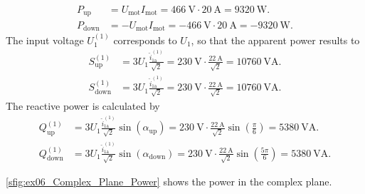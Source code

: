 \begin{solutionblock}
    \begin{equation}
        \begin{split}
            P_\mathrm{up}&=U_\mathrm{mot} I_\mathrm{mot}=\SI{466}{\volt} \cdot \SI{20}{\ampere}= \SI{9320}{\watt}. \\
            P_\mathrm{down}&=-U_\mathrm{mot} I_\mathrm{mot}=\SI{-466}{\volt} \cdot \SI{20}{\ampere}= \SI{-9320}{\watt}.
        \end{split}
    \end{equation}
    The input voltage $U_\mathrm{1}^\mathrm{(1)}$ corresponds to $U_\mathrm{1}$, so that the apparent power results to
    \begin{equation}
        \begin{split}
            S_\mathrm{up}^\mathrm{(1)}&=3 U_\mathrm{1} \frac{\hat{i}_\mathrm{1a}^\mathrm{(1)}}{\sqrt{2}}=\SI{230}{\volt} \cdot \frac{\SI{22}{\ampere}}{\sqrt{2}}= \SI{10760}{\volt\ampere}. \\
            S_\mathrm{down}^\mathrm{(1)}&=3 U_\mathrm{1} \frac{\hat{i}_\mathrm{1a}^\mathrm{(1)}}{\sqrt{2}}=\SI{230}{\volt} \cdot \frac{\SI{22}{\ampere}}{\sqrt{2}}= \SI{10760}{\volt\ampere}.
        \end{split}
    \end{equation}
    The reactive power is calculated by
    \begin{equation}
        \begin{split}
            Q_\mathrm{up}^\mathrm{(1)}&=3 U_\mathrm{1} \frac{\hat{i}_\mathrm{1a}^\mathrm{(1)}}{\sqrt{2}} \sin{(\alpha_\mathrm{up})}
            =\SI{230}{\volt} \cdot \frac{\SI{22}{\ampere}}{\sqrt{2}}\sin{(\frac{\pi}{6})}= \SI{5380}{\volt\ampere}. \\
            Q_\mathrm{down}^\mathrm{(1)}&=3 U_\mathrm{1} \frac{\hat{i}_\mathrm{1a}^\mathrm{(1)}}{\sqrt{2}} \sin{(\alpha_\mathrm{down})}
            =\SI{230}{\volt} \cdot \frac{\SI{22}{\ampere}}{\sqrt{2}}\sin{(\frac{5\pi}{6})}= \SI{5380}{\volt\ampere}.
        \end{split}
    \end{equation}
    
    \autoref{sfig:ex06_Complex_Plane_Power} shows the power in the complex plane.

    

\end{solutionblock}

